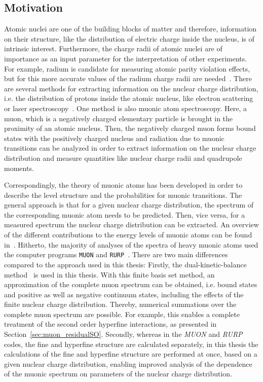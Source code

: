 \subsection{Motivation}
\label{sec:muon_motivation}
Atomic nuclei are one of the building blocks of matter and therefore, information on their structure, like the distribution of electric charge inside the nucleus, is of intrinsic interest. Furthermore, the charge radii of atomic nuclei are of importance as an input parameter for the interpretation of other experiments. For example, radium is candidate for measuring atomic parity violation effects, but for this more accurate values of the radium charge radii are needed~\cite{wansbeek2012}.
There are several methods for extracting information on the nuclear charge distribution, i.e. the distribution of protons inside the atomic nucleus, like electron scattering~\cite{devries1987} or laser spectroscopy~\cite{wang2004,dewitte2007,mueller2007}. One method is also muonic atom spectroscopy. Here, a muon, which is a negatively charged elementary particle is brought in the proximity of an atomic nucleus. Then, the negatively charged muon forms bound states with the positively charged nucleus and radiation due to muonic transitions can be analyzed in order to extract information on the nuclear charge distribution and measure quantities like nuclear charge radii and quadrupole moments.

Correspondingly, the theory of muonic atoms has been developed in order to describe the level structure and the probabilities for muonic transitions. The general approach is that for a given nuclear charge distribution, the spectrum of the corresponding muonic atom needs to be predicted. Then, vice versa, for a measured spectrum the nuclear charge distribution can be extracted. An overview of the different contributions to the energy levels of muonic atoms can be found in~\cite{BorieRinker1982}. Hitherto, the majority of analyses of the spectra of heavy muonic atoms used the computer programs \texttt{MUON} and \texttt{RURP}~\cite{rinker1979}. There are two main differences compared to the approach used in this thesis:
Firstly, the dual-kinetic-balance method~\cite{Shabaev2004} is used in this thesis. With this finite basis set method, an approximation of the complete muon spectrum can be obtained, i.e. bound states and positive as well as negative continuum states, including the effects of the finite nuclear charge distribution. Thereby, numerical summations over the complete muon spectrum are possible. For example, this enables a complete treatment of the second order hyperfine interactions, as presented in Section~\ref{sec:muon_residualSO}.
Secondly, whereas in the \textit{MUON} and \textit{RURP} codes, the fine and hyperfine structure are calculated separately, in this thesis the calculations of the fine and hyperfine structure are performed at once, based on a given nuclear charge distribution, enabling improved analysis of the dependence of the muonic spectrum on parameters of the nuclear charge distribution.

